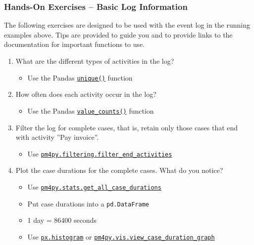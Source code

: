 \begin{tcolorbox}[colback=code]
\subsubsection*{Hands-On Exercises -- Basic Log Information}

The following exercises are designed to be used with the event log in the running examples above. Tips are provided to guide you and to provide links to the documentation for important functions to use.

\begin{enumerate}
    \item What are the different types of activities in the log?
    \begin{itemize}
       \item Use the Pandas \href{https://pandas.pydata.org/docs/reference/api/pandas.unique.html}{\texttt{unique()}} function
    \end{itemize}
    \item How often does each activity occur in the log?
    \begin{itemize}
       \item Use the Pandas \href{https://pandas.pydata.org/pandas-docs/stable/reference/api/pandas.Series.value_counts.html}{\texttt{value\_counts()}} function
    \end{itemize}
    \item Filter the log for complete cases, that is, retain only those cases that end with activity ''Pay invoice''.
    \begin{itemize}
       \item Use \href{https://processintelligence.solutions/static/api/2.7.11/generated/pm4py.filtering.filter_end_activities.html}{\texttt{pm4py.filtering.filter\_end\_activities}}
    \end{itemize}
    \item Plot the case durations for the complete cases. What do you notice?
    \begin{itemize}
       \item Use \href{https://processintelligence.solutions/static/api/2.7.11/generated/pm4py.stats.get_all_case_durations.html}{\texttt{pm4py.stats.get\_all\_case\_durations}}
       \item Put case durations into a \texttt{pd.DataFrame}
       \item 1 day = 86400 seconds
       \item Use \href{https://plotly.com/python/histograms/}{\texttt{px.histogram}} or \href{https://processintelligence.solutions/static/api/2.7.11/generated/pm4py.vis.view_case_duration_graph.html}{\texttt{pm4py.vis.view\_case\_duration\_graph}}

\end{itemize}
\end{enumerate}
\end{tcolorbox}
